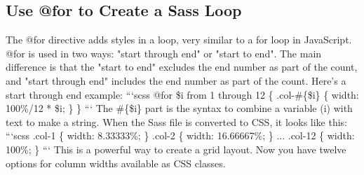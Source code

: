 \documentclass{article}%
\begin{document}
\subsection{Use @for to Create a Sass Loop}%
\label{subsec:Use@fortoCreateaSassLoop}%
The @for directive adds styles in a loop, very similar to a for loop in JavaScript.\newline%
@for is used in two ways: "start through end" or "start to end". The main difference is that the "start to end" excludes the end number as part of the count, and "start through end" includes the end number as part of the count.\newline%
Here's a start through end example:\newline%
```scss\newline%
@for \$i from 1 through 12 \{\newline%
  .col{-}\#\{\$i\} \{ width: 100\%/12 * \$i; \}\newline%
\}\newline%
```\newline%
The \#\{\$i\} part is the syntax to combine a variable (i) with text to make a string. When the Sass file is converted to CSS, it looks like this:\newline%
```scss\newline%
.col{-}1 \{\newline%
  width: 8.33333\%;\newline%
\}\newline%
.col{-}2 \{\newline%
  width: 16.66667\%;\newline%
\}\newline%
...\newline%
.col{-}12 \{\newline%
  width: 100\%;\newline%
\}\newline%
```\newline%
This is a powerful way to create a grid layout. Now you have twelve options for column widths available as CSS classes.\newline%

%
\end{document}
